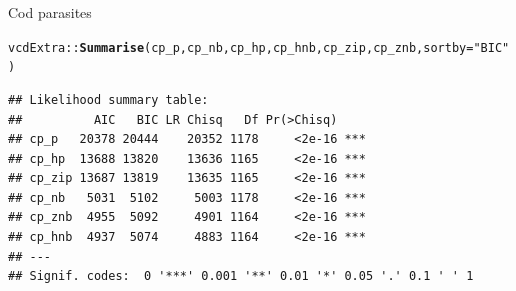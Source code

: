 \documentclass[11pt]{book}\usepackage[]{graphicx}\usepackage[]{color}
\makeatletter
\newcommand{\hlstr}[1]{\textcolor[rgb]{0.192,0.494,0.8}{#1}}%
\newcommand{\hlopt}[1]{\textcolor[rgb]{0,0,0}{#1}}%
\newcommand{\hlstd}[1]{\textcolor[rgb]{0.345,0.345,0.345}{#1}}%
\newcommand{\hlkwc}[1]{\textcolor[rgb]{0.333,0.667,0.333}{#1}}%
\newcommand{\hlkwd}[1]{\textcolor[rgb]{0.737,0.353,0.396}{\textbf{#1}}}%
\newenvironment{kframe}{%
 \def\at@end@of@kframe{}%
 \ifinner\ifhmode%
  \def\at@end@of@kframe{\end{minipage}}%
  \begin{minipage}{\columnwidth}%
 \fi\fi%
 \def\FrameCommand##1{\hskip\@totalleftmargin \hskip-\fboxsep
 \colorbox{shadecolor}{##1}\hskip-\fboxsep
     \hskip-\linewidth \hskip-\@totalleftmargin \hskip\columnwidth}%
 \MakeFramed {\advance\hsize-\width
   \@totalleftmargin\z@ \linewidth\hsize
   \@setminipage}}%
 {\par\unskip\endMakeFramed%
 \at@end@of@kframe}
\newenvironment{knitrout}{}{} %
\renewenvironment{knitrout}{\small\renewcommand{\baselinestretch}{.85}}{} %
\makeatother
\begin{document}
\begin{Example}[cod2]{Cod parasites}
\begin{knitrout}
\color{fgcolor}\begin{kframe}
\begin{alltt}
\hlstd{vcdExtra}\hlopt{::}\hlkwd{Summarise}\hlstd{(cp_p, cp_nb, cp_hp, cp_hnb, cp_zip, cp_znb,} \hlkwc{sortby}\hlstd{=}\hlstr{"BIC"}\hlstd{)}
\end{alltt}
\begin{verbatim}
## Likelihood summary table:
##          AIC   BIC LR Chisq   Df Pr(>Chisq)    
## cp_p   20378 20444    20352 1178     <2e-16 ***
## cp_hp  13688 13820    13636 1165     <2e-16 ***
## cp_zip 13687 13819    13635 1165     <2e-16 ***
## cp_nb   5031  5102     5003 1178     <2e-16 ***
## cp_znb  4955  5092     4901 1164     <2e-16 ***
## cp_hnb  4937  5074     4883 1164     <2e-16 ***
## ---
## Signif. codes:  0 '***' 0.001 '**' 0.01 '*' 0.05 '.' 0.1 ' ' 1
\end{verbatim}
\end{kframe}
\end{knitrout}


\end{Example}
\end{document}
